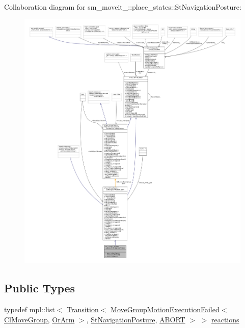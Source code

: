 Collaboration diagram for sm\+\_\+moveit\+\_\+:\+:place\+\_\+states\+:\+:St\+Navigation\+Posture\+:
\nopagebreak
\begin{figure}[H]
\begin{center}
\leavevmode
\includegraphics[width=350pt]{structsm__moveit__4_1_1place__states_1_1StNavigationPosture__coll__graph}
\end{center}
\end{figure}
\subsection*{Public Types}
\begin{DoxyCompactItemize}
\item 
typedef mpl\+::list$<$ \hyperlink{classsmacc_1_1Transition}{Transition}$<$ \hyperlink{structmoveit__z__client_1_1MoveGroupMotionExecutionFailed}{Move\+Group\+Motion\+Execution\+Failed}$<$ \hyperlink{classmoveit__z__client_1_1ClMoveGroup}{Cl\+Move\+Group}, \hyperlink{classsm__moveit__4_1_1OrArm}{Or\+Arm} $>$, \hyperlink{structsm__moveit__4_1_1place__states_1_1StNavigationPosture}{St\+Navigation\+Posture}, \hyperlink{structsmacc_1_1default__transition__tags_1_1ABORT}{A\+B\+O\+RT} $>$ $>$ \hyperlink{structsm__moveit__4_1_1place__states_1_1StNavigationPosture_a2588352d77d56f7a1f3df49fe37629d4}{reactions}
\end{DoxyCompactItemize}
